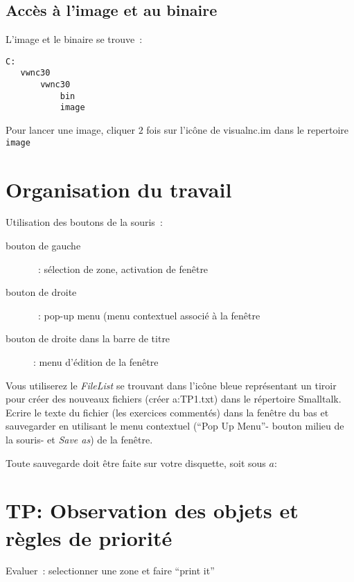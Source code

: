 

\subsection{Acc\`es \`a l'image et au binaire}

L'image et le binaire se trouve~:
\begin{verbatim}
C:
   vwnc30
       vwnc30
           bin
           image
\end{verbatim}


Pour lancer une image, cliquer $2$ fois sur l'ic\^one de visualnc.im
dans le repertoire \verb|image|



\section{Organisation du travail}
Utilisation des boutons de la souris~:
\begin{description}
\item [bouton de gauche]~: s\'election de zone, activation de fen\^etre
\item [bouton de droite]~: pop-up menu (menu contextuel associ\'e \`a la fen\^etre
\item [bouton de droite dans la barre de titre]:  menu d'\'edition de la fen\^etre
\end{description}

Vous utiliserez le {\it FileList} se trouvant dans l'ic\^one bleue
repr\'esentant un tiroir pour cr\'eer des nouveaux fichiers
(cr\'eer a:TP1.txt)  dans le r\'epertoire Smalltalk.\\

Ecrire le texte du fichier (les exercices comment\'es) dans la fen\^etre du bas et sauvegarder en utilisant le menu contextuel (``Pop Up Menu''- bouton milieu de la souris- et {\it Save as}) de la fen\^etre.

Toute sauvegarde doit \^etre faite sur votre disquette, soit sous $a:$

\section{TP: Observation des objets et r\`egles de priorit\'e }
Evaluer~: selectionner une zone et faire ``print it''


